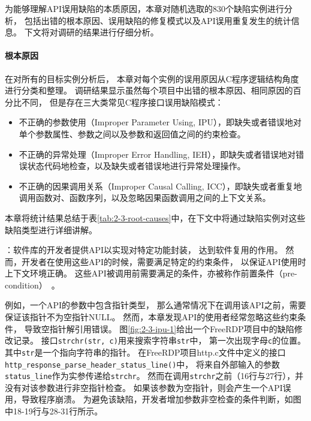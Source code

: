 为能够理解API误用缺陷的本质原因，本章对随机选取的830个缺陷实例进行分析，
包括出错的根本原因、误用缺陷的修复模式以及API误用重复发生的统计信息。
下文将对调研的结果进行仔细分析。


\paragraph{根本原因}

在对所有的目标实例分析后，
本章对每个实例的误用原因从C程序逻辑结构角度进行分类和整理。
调研结果显示虽然每个项目中出错的根本原因、相同原因的百分比不同，
但是存在三大类常见C程序接口误用缺陷模式：
\begin{itemize}
	\item 不正确的参数使用（Improper Parameter Using, IPU），即缺失或者错误地对单个参数属性、参数之间以及参数和返回值之间的约束检查。
	\item 不正确的异常处理（Improper Error Handling, IEH），即缺失或者错误地对错误状态代码地检查，以及缺失或者错误地进行异常处理操作。
	\item 不正确的因果调用关系（Improper Causal Calling, ICC），即缺失或者重复地调用函数对、函数序列，以及忽略因果函数调用之间的上下文关系。
\end{itemize}
本章将统计结果总结于表\ref{tab:2-3-root-causes}中，在下文中将通过缺陷实例对这些缺陷类型进行详细讲解。



：软件库的开发者提供API以实现对特定功能封装，
达到软件复用的作用。
然而，开发者在使用这些API的时候，需要满足特定的约束条件，
以保证API使用时上下文环境正确。
这些API被调用前需要满足的条件，亦被称作前置条件（pre-condition）~\cite{14-fse-pre}。

例如，一个API的参数中包含指针类型，
那么通常情况下在调用该API之前，需要保证该指针不为空指针NULL。
然而，本章发现API的使用者经常忽略这些约束条件，
导致空指针解引用错误。
图\ref{fig:2-3-ipu-1}给出一个FreeRDP项目中的缺陷修改记录。
接口\texttt{strchr(str, c)}用来搜索字符串\texttt{str}中，
第一次出现字母\texttt{c}的位置。
其中\texttt{str}是一个指向字符串的指针。
在FreeRDP项目http.c文件中定义的接口\texttt{http\_response\_parse\_header\_status\_line()}中，
将来自外部输入的参数\texttt{status\_line}作为实参传递给\texttt{strchr}。
然而在调用\texttt{strchr}之前（16行与27行），并没有对该参数进行非空指针检查。
如果该参数为空指针，则会产生一个API误用，导致程序崩溃。
为避免该缺陷，开发者增加参数非空检查的条件判断，如图中18-19行与28-31行所示。


